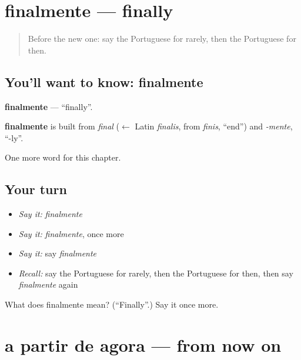 \section[finalmente]{finalmente — finally}

\label{lesson:PT-C150-finalmente}



\begin{quote}
Before the new one: say the Portuguese for rarely, then the Portuguese for then.
\end{quote}

\subsection*{You'll want to know: finalmente}
\textbf{finalmente} — \textquotedblleft{}finally\textquotedblright{}.

\begin{cousinweb}
\textbf{finalmente} is built from \emph{final} ($\leftarrow$ Latin \emph{finalis}, from \emph{finis}, \textquotedblleft{}end\textquotedblright{}) and \emph{-mente}, \textquotedblleft{}-ly\textquotedblright{}.
\end{cousinweb}

\begin{grammarlens}[title={What you've built}]
One more word for this chapter.
\end{grammarlens}

\subsection*{Your turn}
\begin{itemize}
\raggedright
  \item \emph{Say it:} \emph{finalmente}
  \item \emph{Say it:} \emph{finalmente}, once more
  \item \emph{Say it:} say \emph{finalmente}
  \item \emph{Recall:} say the Portuguese for rarely, then the Portuguese for then, then say \emph{finalmente} again
\end{itemize}

\begin{tcolorbox}[breakable,colback=teal!4,colframe=teal!35!black,title={Before you move on}]
What does finalmente mean? (\textquotedblleft{}Finally\textquotedblright{}.) Say it once more.
\end{tcolorbox}
\section[a partir de agora]{a partir de agora — from now on}

